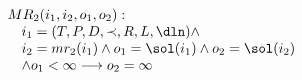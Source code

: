 \begin{framed}
  \begin{displaymath}
      \begin{array}{l}
    MR_{2}(i_1,i_2,o_{1},o_{2}):\\
      \hskip 1em i_1=(T,P,D,\prec,R,L,\dln)\wedge  \\
      \hskip 1em  i_2=mr_2(i_1)\wedge o_{1}=\sol(i_{1})\wedge o_{2}=\sol(i_2)\\
      \hskip 1em \wedge o_{1}<\infty
      \longrightarrow o_2=\infty
    \end{array}
  \end{displaymath}
\end{framed}

















